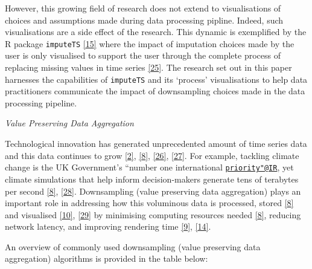 \documentclass{article}
\begin{document}
However, this growing field of research does not extend to
visualisations of choices and assumptions made during data processing
pipline. Indeed, such visualisations are a side effect of the research.
This dynamic is exemplified by the R package \texttt{imputeTS}
\protect\hyperlink{ref-imputeTS_R}{{[}15{]}} where the impact of
imputation choices made by the user is only visualised to support the
user through the complete process of replacing missing values in time
series \protect\hyperlink{ref-imputeTS}{{[}25{]}}. The research set out
in this paper harnesses the capabilities of \texttt{imputeTS} and its
`process' visualisations to help data practitioners communicate the
impact of downsampling choices made in the data processing pipeline.

\emph{Value Preserving Data Aggregation}

Technological innovation has generated unprecedented amount of time
series data and this data continues to grow
\protect\hyperlink{ref-data2020}{{[}2{]}},
\protect\hyperlink{ref-TVStore}{{[}8{]}},
\protect\hyperlink{ref-storage}{{[}26{]}},
\protect\hyperlink{ref-CatchUp}{{[}27{]}}. For example, tackling climate
change is the UK Government's ``number one international
\href{mailto:priority\%22@IR}{\nolinkurl{priority"@IR}}, yet climate
simulations that help inform decision-makers generate tens of terabytes
per second \protect\hyperlink{ref-TVStore}{{[}8{]}},
\protect\hyperlink{ref-climate}{{[}28{]}}. Downsampling (value
preserving data aggregation) plays an important role in addressing how
this voluminous data is processed, stored
\protect\hyperlink{ref-TVStore}{{[}8{]}} and visualised
\protect\hyperlink{ref-Sveinn}{{[}10{]}},
\protect\hyperlink{ref-dashql}{{[}29{]}} by minimising computing
resources needed \protect\hyperlink{ref-TVStore}{{[}8{]}}, reducing
network latency, and improving rendering time
\protect\hyperlink{ref-datapoint}{{[}9{]}},
\protect\hyperlink{ref-MinMaxLTTB}{{[}14{]}}.

An overview of commonly used downsampling (value preserving data
aggregation) algorithms is provided in the table below:
\end{document}
